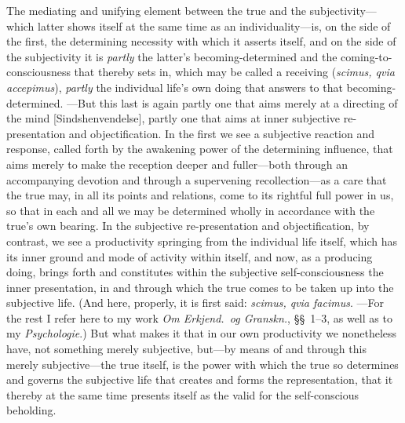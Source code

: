 \documentclass[12pt,a4paper]{book}
\begin{document}
The mediating and unifying element between the true and the subjectivity---which
latter shows itself at the same time as an individuality---is, on the side of the
first, the determining necessity with which it asserts itself, and on the side of
the subjectivity it is \emph{partly} the latter's becoming-determined and the
coming-to-consciousness that thereby sets in, which may be called a receiving
(\textit{scimus, qvia accepimus}), \emph{partly} the individual life's own doing
that answers to that becoming-determined. ---But this last is again partly one
that aims merely at a directing of the mind [Sindshenvendelse], partly one that
aims at inner subjective re-presentation and objectification. In the first we see
a subjective reaction and response, called forth by the awakening power of the
determining influence, that aims merely to make the reception deeper and
fuller---both through an accompanying devotion and through a supervening
recollection---as a care that the true may, in all its points and relations, come
to its rightful full power in us, so that in each and all we may be determined
wholly in accordance with the true's own bearing. In the subjective
re-presentation and objectification, by contrast, we see a productivity springing
from the individual life itself, which has its inner ground and mode of activity
within itself, and now, as a producing doing, brings forth and constitutes within
the subjective self-consciousness the inner presentation, in and through which the
true comes to be taken up into the subjective life. (And here, properly, it is
first said: \textit{scimus, qvia facimus}. ---For the rest I refer here to my work
\textit{Om Erkjend.\ og Granskn.}, \S\S~1--3, as well as to my \textit{Psychologie}.)
But what makes it that in our own productivity we nonetheless have, not something
merely subjective, but---by means of and through this merely subjective---the true
itself, is the power with which the true so determines and governs the subjective
life that creates and forms the representation, that it thereby at the same time
presents itself as the valid for the self-conscious beholding.
\end{document}
